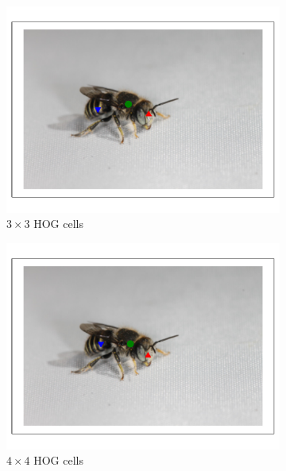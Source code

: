 \documentclass[11pt, oneside]{report}
\begin{document}
        \begin{figure}[p]
            \centering
            \begin{subfigure}[b]{0.3\textwidth}
                \centering
                \includegraphics[width=\textwidth]{hog3_1.pdf}
                \caption{$3\times3$ HOG cells}
            \end{subfigure}
            \begin{subfigure}[b]{0.3\textwidth}
                \centering
                \includegraphics[width=\textwidth]{hog4_1.pdf}
                \caption{$4\times4$ HOG cells}
            \end{subfigure}
            \begin{subfigure}[b]{0.3\textwidth}

\end{subfigure}
\end{figure}
\end{document}
